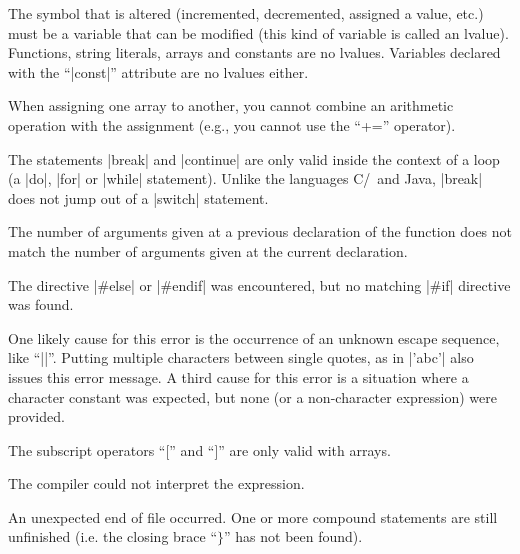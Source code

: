 { 
        The symbol that is altered (incremented, decremented, assigned a
        value, etc.) must be a variable that can be modified (this kind of
        variable is called an lvalue). Functions, string literals, arrays and
        constants are no lvalues. Variables declared with the ``|const|''
        attribute are no lvalues either.

 
        When assigning one array to another, you cannot combine an arithmetic
        operation with the assignment (e.g., you cannot use the ``+=''
        operator).

 
        The statements |break| and |continue| are only valid inside the context
        of a loop (a |do|, |for| or |while| statement). Unlike the languages
        C/\Cpp\ and Java, |break| does not jump out of a |switch| statement.

 
        The number of arguments given at a previous declaration of the
        function does not match the number of arguments given at the current
        declaration.

 
        The directive |#else| or |#endif| was encountered, but no matching
        |#if| directive was found.

        One likely cause for this error is the occurrence of an unknown escape
        sequence, like ``|\x|''. Putting multiple characters between single
        quotes, as in |'abc'| also issues this error message. A third cause
        for this error is a situation where a character constant was expected,
        but none (or a non-character expression) were provided.

 
        The subscript operators ``['' and ``]'' are only valid with arrays.

 
        The compiler could not interpret the expression.

 
        An unexpected end of file occurred. One or more compound statements are
        still unfinished (i.e. the closing brace ``$\}$'' has not been found).

}
